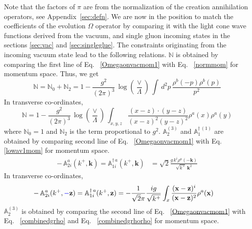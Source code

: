 \documentclass[aps,prd,amsmath,amssymb,nofootinbib]{revtex4-2}
\def\mf#1{\mathbb{#1}}
\numberwithin{equation}{section}
\begin{document}
Note that the factors of $\pi$ are from the normalization of the creation annihilation operators, see Appendix~\ref{sec:defn}. We are now in the position to match the coefficients of the evolution $\Omega$ operator by comparing it with the light cone wave functions derived from the vacuum, and single gluon incoming states in the sections \ref{sec:vac} and \ref{sec:singleglue}. The constraints originating from the incoming vacuum state lead to the following relations. $\mf{N}$ is obtained by comparing the first line of Eq.~ \eqref{Omegaonvacmom1} with Eq.~ \eqref{normmom} for momentum space. Thus, we get
\begin{equation}\label{Ncoeffmom}
    \mf{N} =  \mf{N}_0 +  \mf{N}_2 = 1- \frac{g^{2}}{(2\pi)^{3}}\, \log{\left(\frac{\vee}{\Lambda}\right)}\,\int\, d^{2}p\,\frac{\rho^{b}(-p)\rho^{b}(p)}{p^{2}}
\end{equation}
In transverse co-ordinates,
\begin{equation}\label{eq:Ncoeffpos}
    \mf{N}  = 1 -
    \frac{g^{2}}{(2\pi)^{3}}\, \log{\left(\frac{\vee}{\Lambda}\right)}\, \int_{x,y,z}\frac{(x-z)\cdot (y-z)}{(x-z)^{2}(y-z)^{2}}\rho^{a}(x)\rho^{a}(y)
\end{equation}
where  $ \mf{N}_0=1$ and  $\mf{N}_2$ is the term proportional to $g^2$. $\mf{A}^{(3)}_{2}$ and $\mf{A}^{\dagger\, (1)}_{1}$ are obtained by comparing second line of Eq.~ \eqref{Omegaonvacmom1} with Eq.~ \eqref{lowav1mom} for momentum space. 
\begin{align}
\label{A1coeffM}
  -\,\mf{A}^{a}_{2i}(k^{+},\mathbf{k}) =  \mf{A}^{\dagger\,a}_{ 1 i}(k^{+},\mathbf{k}) & = \sqrt{2} \frac{g\,k^{i}\rho^{a}(-\mathbf{k})}{ \sqrt{k^{+}}\,\mathbf{k}^{2}} 
\end{align}
In transverse co-ordinates,
\begin{align}
\label{A1coeff}
  -\, \mf{A}^{a}_{2i}(k^{+},\textcolor{blue}{-}\mathbf{z}) =   \mf{A}^{\dagger\,a}_{1 i}(k^{+},\mathbf{z}) & = - \frac{1}{\sqrt{2}\pi}\frac{ig}{\sqrt{k^+}}\int_{x}\frac{(\mathbf{x}-\mathbf{z})^{i}}{(\mathbf{x}-\mathbf{z})^{2}} \rho^{a}(\mathbf{x}) 
\end{align}
$ \mf{A}^{(3)}_{2}$ is obtained by comparing the second line of Eq.~ \eqref{Omegaonvacmom1} with Eq.~ \eqref{combinedgrho} and Eq.~ \eqref{combinedgrhorho} for momentum space. 
\end{document}
